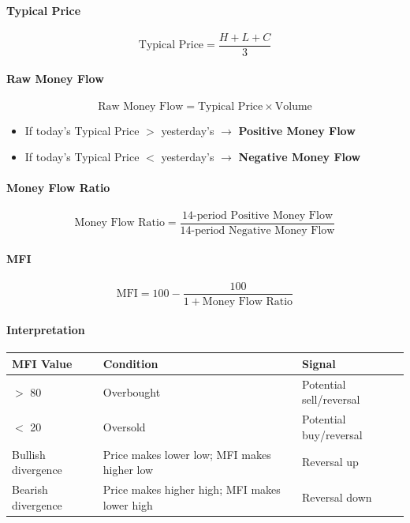 \documentclass[12pt,openany]{book}
\begin{document}
\paragraph{Typical Price}
\[
\text{Typical Price} = \frac{H + L + C}{3}
\]

\paragraph{Raw Money Flow}
\[
\text{Raw Money Flow} = \text{Typical Price} \times \text{Volume}
\]

\begin{itemize}[leftmargin=*]
    \item If today's Typical Price \(>\) yesterday's \(\rightarrow\) \textbf{Positive Money Flow}
    \item If today's Typical Price \(<\) yesterday's \(\rightarrow\) \textbf{Negative Money Flow}
\end{itemize}

\paragraph{Money Flow Ratio}
\[
\text{Money Flow Ratio} = \frac{\text{14-period Positive Money Flow}}{\text{14-period Negative Money Flow}}
\]

\paragraph{MFI}
\[
\text{MFI} = 100 - \frac{100}{1 + \text{Money Flow Ratio}}
\]

\paragraph{Interpretation}

\begin{center}
\small
\renewcommand{\arraystretch}{1.2}
\begin{tabular}{|L{0.25\textwidth}|L{0.34\textwidth}|L{0.31\textwidth}|}
\hline
 \textbf{MFI Value} & \textbf{Condition} & \textbf{Signal} \\ \hline
 \(>\) 80 & Overbought & Potential sell/reversal \\ \hline
 \(<\) 20 & Oversold & Potential buy/reversal \\ \hline
 Bullish divergence & Price makes lower low; MFI makes higher low & Reversal up \\ \hline
 Bearish divergence & Price makes higher high; MFI makes lower high & Reversal down \\ \hline
\end{tabular}
\end{center}
\end{document}
